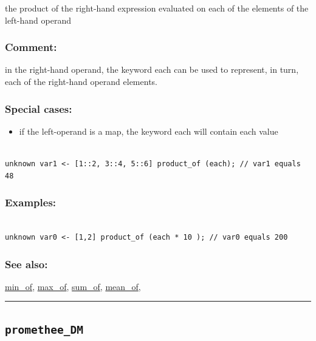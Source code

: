 \documentclass[]{book}
\providecommand{\tightlist}{%
  \setlength{\itemsep}{0pt}\setlength{\parskip}{0pt}}
\theoremstyle{definition}
\theoremstyle{definition}
\theoremstyle{definition}
\theoremstyle{remark}
\begin{document}
the product of the right-hand expression evaluated on each of the
elements of the left-hand operand

\subsubsection{Comment:}\label{comment-79}

in the right-hand operand, the keyword each can be used to represent, in
turn, each of the right-hand operand elements.

\subsubsection{Special cases:}\label{special-cases-113}

\begin{itemize}
\tightlist
\item
  if the left-operand is a map, the keyword each will contain each value
\end{itemize}

\begin{verbatim}
 
unknown var1 <- [1::2, 3::4, 5::6] product_of (each); // var1 equals 48
\end{verbatim}

\subsubsection{Examples:}\label{examples-291}

\begin{verbatim}
 
unknown var0 <- [1,2] product_of (each * 10 ); // var0 equals 200
\end{verbatim}

\subsubsection{See also:}\label{see-also-169}

\href{operators-i-to-m.html\#min_of}{min\_of},
\href{operators-i-to-m.html\#max_of}{max\_of},
\href{operators-s-to-z.html\#sum_of}{sum\_of},
\href{operators-i-to-m.html\#mean_of}{mean\_of},

\begin{center}\rule{0.5\linewidth}{\linethickness}\end{center}

\subsection{\texorpdfstring{\texttt{promethee\_DM}}{promethee\_DM}}\label{promethee_dm}
\end{document}
